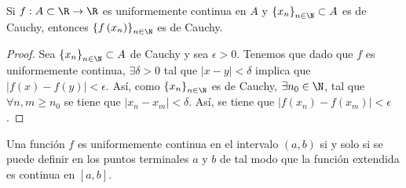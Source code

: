 \begin{ftheorem}[]
	\normalfont Si $\displaystyle f : A \subset \R \to \R $ es uniformemente continua en $\displaystyle A $ y $\displaystyle \left\{ x_{n}\right\} _{n\in\N} \subset A$ es de Cauchy, entonces $\displaystyle \left\{ f\left(x_{n}\right)\right\} _{n\in\N} $ es de Cauchy.
\end{ftheorem}
\begin{proof}
	Sea $\displaystyle \left\{ x_{n}\right\} _{n\in\N}\subset A $ de Cauchy y sea $\displaystyle \epsilon > 0 $. Tenemos que dado que $\displaystyle f $ es uniformemente continua, $\displaystyle \exists \delta > 0 $ tal que $\displaystyle \left|x-y\right| < \delta  $ implica que $\displaystyle \left|f\left(x\right)-f\left(y\right)\right| < \epsilon  $. Así, como $\displaystyle \left\{ x_{n}\right\} _{n\in\N} $ es de Cauchy, $\displaystyle \exists n_{0} \in \N $, tal que $\displaystyle \forall n,m \geq n_{0} $ se tiene que $\displaystyle \left|x_{n}-x_{m}\right| < \delta  $. Así, se tiene que $\displaystyle \left|f\left(x_{n}\right)-f\left(x_{m}\right)\right| < \epsilon  $.
\end{proof}
\begin{ftheorem}
	\normalfont Una función $\displaystyle f $ es uniformemente continua en el intervalo $\displaystyle \left(a,b\right) $ si y solo si se puede definir en los puntos terminales $\displaystyle a $ y $\displaystyle b $ de tal modo que la función extendida es continua en $\displaystyle \left[a,b\right]  $.
\end{ftheorem}
